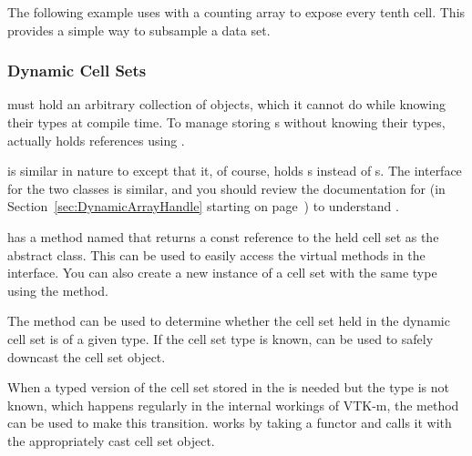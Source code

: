 The following example uses  with a counting
array to expose every tenth cell. This provides a simple way to subsample a
data set.



\subsubsection{Dynamic Cell Sets}


 must hold an arbitrary collection of 
objects, which it cannot do while knowing their types at compile time. To
manage storing s without knowing their types,
 actually holds references using
.

 is similar in nature to
 except that it, of course, holds
s instead of s. The
interface for the two classes is similar, and you should review the
documentation for  (in
Section~\ref{sec:DynamicArrayHandle} starting on
page~\pageref{sec:DynamicArrayHandle}) to understand
.

 has a method named  that
returns a const reference to the held cell set as the abstract
 class. This can be used to easily access the
virtual methods in the  interface. You can also
create a new instance of a cell set with the same type using the
 method.

The  method can be used
to determine whether the cell set held in the dynamic cell set is of a
given type. If the cell set type is known,
 can be used to safely
downcast the cell set object.

When a typed version of the cell set stored in the
 is needed but the type is not known, which
happens regularly in the internal workings of VTK-m, the
 method can be used to make this transition.
 works by taking a functor and calls it with the
appropriately cast cell set object.

